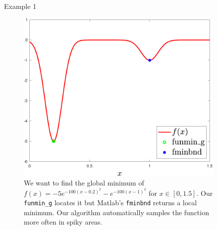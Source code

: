 \documentclass[final]{beamer}
\newlength{\sepwid}
\newlength{\onecolwid}
\newlength{\twocolwid}
\begin{document}
\begin{frame}[t]
\begin{columns}[t]
\begin{column}{\onecolwid}
\begin{block}{Example 1}
	\begin{figure}
		\centering
		\includegraphics[width=0.76\linewidth]{example_funmin_g.pdf}
		\caption{We want to find the global minimum of 
		$f(x) = -5 e^{-100(x-0.2)^2}-e^{ -100(x-1)^2}$ for $x \in [0, 1.5]$.
		Our \texttt{funmin\_g} locates it but Matlab's \texttt{fminbnd} returns a local minimum.
	         Our algorithm automatically samples the function more often in spiky areas.}
     \end{figure}
	
\end{block}	




\end{column} %

\begin{column}{\sepwid}\end{column} %

\begin{column}{\twocolwid} %

\begin{columns}[t,totalwidth=\twocolwid] %

\begin{column}{\onecolwid}\vspace{-.8in} %



\end{column}
\end{columns}
\end{column}
\end{columns}
\end{frame}
\end{document}
